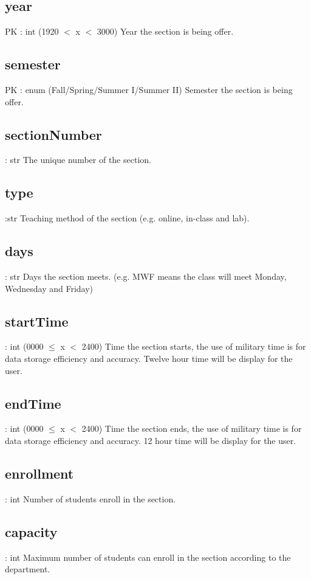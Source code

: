 	\subsection{year}
		PK : int (1920 $<$ x $<$ 3000) 
		Year the section is being offer.
		
	\subsection{semester}
		PK : enum (Fall/Spring/Summer I/Summer II)
		Semester the section is being offer.
	
	\subsection{sectionNumber}
	 	: str 
		The unique number of the section.
	
	\subsection{type}
	 	:str 
		Teaching method of the section (e.g. online, in-class and lab).   
	
	
	\subsection{days}
		: str 
		Days the section meets. (e.g. MWF means the class will meet Monday, Wednesday and Friday)
	
	\subsection{startTime}
		: int (0000 $\leq$ x $<$ 2400)
		Time the section starts, the use of military time is for data storage efficiency and accuracy. Twelve hour time will be display for the user.
	
	\subsection{endTime}
	 	: int (0000 $\leq$ x $<$ 2400) 
		Time the section ends, the use of military time is for data storage efficiency and accuracy. 12 hour time will be display for the user.
	
	\subsection{enrollment}
		: int  
		Number of students enroll in the section.
	
	\subsection{capacity}
		: int
		Maximum number of students can enroll in the section according to the department. 
